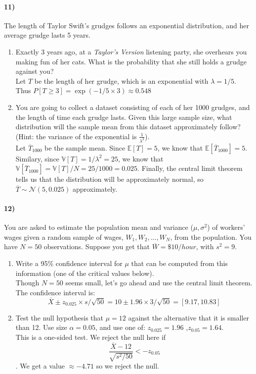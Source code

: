 \documentclass[12pt]{article}
\newcommand\ov{\overline}
\newcommand\BB{\mathbb}
\newcommand\EE{\mathbb{E}}
\newcommand\mc{\mathcal}
\numberwithin{equation}{section}
\numberwithin{figure}{section}
\numberwithin{table}{section}
\begin{document}
\paragraph{11)} The length of Taylor Swift's grudges follows an exponential distribution, and her average grudge lasts 5 years.
\begin{enumerate}
\item Exactly 3 years ago, at a \emph{Taylor's Version} listening party, she overhears you making fun of her cats. What is the probability that she still holds a grudge against you? \\
{\color{blue} Let $T$ be the length of her grudge, which is an exponential with $\lambda=1/5$. Thus $P[T\geq 3] = \exp(-1/5\times 3) \approx 0.548$}
\item You are going to collect a dataset consisting of each of her 1000 grudges, and the length of time each grudge lasts. Given this large sample size, what distribution will the sample mean from this dataset approximately follow? (Hint: the variance of the exponential is $\frac{1}{\lambda^2}$). \\
{\color{blue} Let $\ov{T}_{1000}$ be the sample mean. Since $\EE[T] = 5$, we know that $\EE[\ov{T}_{1000}] = 5$. Similary, since $\BB{V}[T] = 1/\lambda^2 = 25$, we know that $\BB{V}[\ov{T}_{1000}] = \BB{V}[T]/N = 25/1000 = 0.025$. Finally, the central limit theorem tells us that the distribution will be approximately normal, so $\ov{T}\sim\mc{N}(5,0.025)$ approximately.}
\end{enumerate}


\paragraph{12)} You are asked to estimate the population mean and variance ($\mu,\sigma^2$) of workers' wages given a random sample of wages, $W_1,W_2,...,W_N$, from the population. You have $N=50$ observations. Suppose you get that $\ov{W}=\$10/hour$, with $s^2=9$.
\begin{enumerate}
\item Write a 95\% confidence interval for $\mu$ that can be computed from this information (one of the critical values below). \\
  {\color{blue} Though $N=50$ seems small, let's go ahead and use the central limit theorem. The confidence interval is:
\[\ov{X}\pm z_{0.025}\times s/\sqrt{50} = 10 \pm 1.96 \times 3/\sqrt{50} = [9.17,10.83]\]}

\item Test the null hypothesis that $\mu=12$ against the alternative that it is smaller than 12. Use size $\alpha=0.05$, and use one of: $z_{0.025}=1.96$ ,$z_{0.05}=1.64$. \\
  {\color{blue} This is a one-sided test. We reject the null here if \[\frac{\ov{X}-12}{\sqrt{s^2/50}}< -z_{0.05}\]. We get a value $\approx -4.71$ so we reject the null.}
\end{enumerate}
\end{document}
